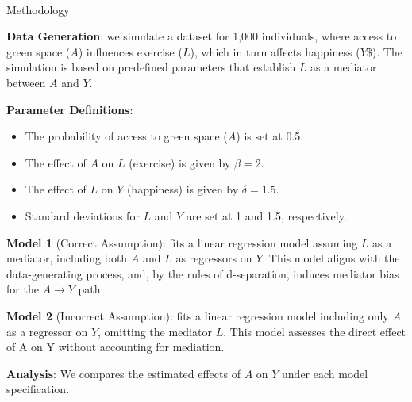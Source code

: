 \documentclass[
  singlecolumn]{article}
\makeatletter
\let\oldparagraph\paragraph
\renewcommand{\paragraph}{
    \@ifstar
      \xxxParagraphStar
      \xxxParagraphNoStar
  }
\newcommand{\xxxParagraphStar}[1]{\oldparagraph*{#1}\mbox{}}
\newcommand{\xxxParagraphNoStar}[1]{\oldparagraph{#1}\mbox{}}
\providecommand{\tightlist}{%
  \setlength{\itemsep}{0pt}\setlength{\parskip}{0pt}}\usepackage{longtable,booktabs,array}
\makeatother
\begin{document}
\paragraph{Methodology}\label{methodology}

\textbf{Data Generation}: we simulate a dataset for 1,000 individuals,
where access to green space (\(A\)) influences exercise (\(L\)), which
in turn affects happiness (\(Y\)\$). The simulation is based on
predefined parameters that establish \(L\) as a mediator between \(A\)
and \(Y\).

\textbf{Parameter Definitions}:

\begin{itemize}
\tightlist
\item
  The probability of access to green space (\(A\)) is set at 0.5.
\item
  The effect of \(A\) on \(L\) (exercise) is given by \(\beta = 2\).
\item
  The effect of \(L\) on \(Y\) (happiness) is given by \(\delta = 1.5\).
\item
  Standard deviations for \(L\) and \(Y\) are set at 1 and 1.5,
  respectively.
\end{itemize}

\textbf{Model 1} (Correct Assumption): fits a linear regression model
assuming \(L\) as a mediator, including both \(A\) and \(L\) as
regressors on \(Y\). This model aligns with the data-generating process,
and, by the rules of d-separation, induces mediator bias for the
\(A\to Y\) path.

\textbf{Model 2} (Incorrect Assumption): fits a linear regression model
including only \(A\) as a regressor on \(Y\), omitting the mediator
\(L\). This model assesses the direct effect of A on Y without
accounting for mediation.

\textbf{Analysis}: We compares the estimated effects of \(A\) on \(Y\)
under each model specification.
\end{document}

